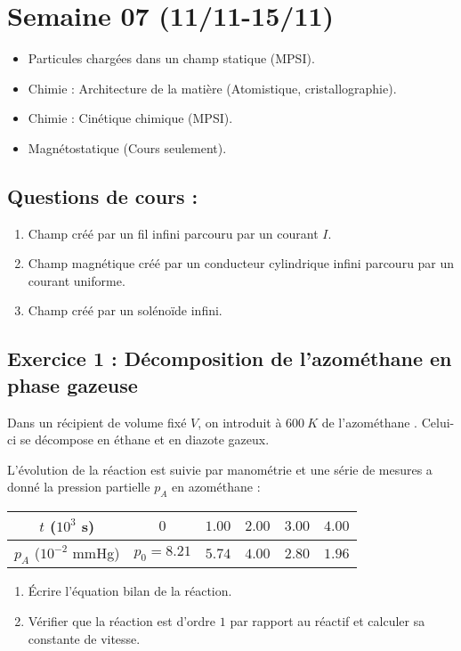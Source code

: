 \section{Semaine 07 (11/11-15/11) }

\begin{itemize}
	\item Particules chargées dans un champ statique (MPSI).
	\item Chimie : Architecture de la matière (Atomistique, cristallographie).
	\item Chimie : Cinétique chimique (MPSI).
	\item Magnétostatique (Cours seulement).
\end{itemize}

\subsection{Questions de cours :}
\begin{enumerate}
	\item Champ créé par un fil infini parcouru par un courant $I$.
	\item Champ magnétique créé par un conducteur cylindrique infini parcouru par un courant uniforme.
	\item Champ créé par un solénoïde infini.
\end{enumerate}

\subsection{Exercice 1 : Décomposition de l'azométhane en phase gazeuse}

Dans un récipient de volume fixé $V$, on introduit à $\SI{600}{K}$ de l'azométhane . Celui-ci se décompose en éthane et en diazote gazeux. 

L'évolution de la réaction est suivie par manométrie et une série de mesures a donné la pression partielle $p_A$ en azométhane : 

\begin{tabular}{|c|c|c|c|c|c|}
	\hline 
	$t$ ($10^3$ s) & $0$ & $1.00$ & $2.00$ & $3.00$ & $4.00$ \\ \hline
	$p_A$ ($10^{-2}$ mmHg) & $p_0 = 8.21$ & $5.74$ & $4.00$ & $2.80$ & $1.96$ \\ \hline
\end{tabular}

\begin{enumerate}
	\item Écrire l'équation bilan de la réaction.
	\item Vérifier que la réaction est d'ordre $1$ par rapport au réactif et calculer sa constante de vitesse.
\end{enumerate}

